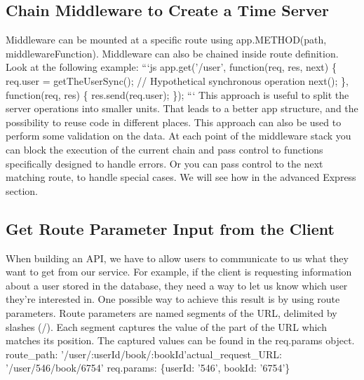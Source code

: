 \documentclass{article}%
\begin{document}
\subsection{Chain Middleware to Create a Time Server}%
\label{subsec:ChainMiddlewaretoCreateaTimeServer}%
Middleware can be mounted at a specific route using app.METHOD(path, middlewareFunction). Middleware can also be chained inside route definition.\newline%
Look at the following example:\newline%
```js\newline%
app.get('/user', function(req, res, next) \{\newline%
  req.user = getTheUserSync();  // Hypothetical synchronous operation\newline%
  next();\newline%
\}, function(req, res) \{\newline%
  res.send(req.user);\newline%
\});\newline%
```\newline%
This approach is useful to split the server operations into smaller units. That leads to a better app structure, and the possibility to reuse code in different places. This approach can also be used to perform some validation on the data. At each point of the middleware stack you can block the execution of the current chain and pass control to functions specifically designed to handle errors. Or you can pass control to the next matching route, to handle special cases. We will see how in the advanced Express section.\newline%

%
\subsection{Get Route Parameter Input from the Client}%
\label{subsec:GetRouteParameterInputfromtheClient}%
When building an API, we have to allow users to communicate to us what they want to get from our service. For example, if the client is requesting information about a user stored in the database, they need a way to let us know which user they're interested in. One possible way to achieve this result is by using route parameters. Route parameters are named segments of the URL, delimited by slashes (/). Each segment captures the value of the part of the URL which matches its position. The captured values can be found in the req.params object.\newline%
route\_path: '/user/:userId/book/:bookId'actual\_request\_URL: '/user/546/book/6754' req.params: \{userId: '546', bookId: '6754'\}\newline%
\end{document}
